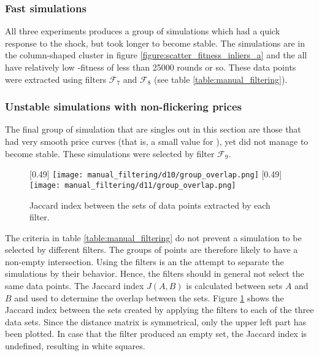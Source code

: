 \subsubsection*{Fast simulations}
All three experiments produces a group of simulations which had a quick response to the shock, but took longer to become stable. The simulations are in the column-shaped cluster in figure \ref{figure:scatter_fitness_inliers_a} and the all have relatively low \timetoreachnewfundamental-fitness of less than 25000 rounds or so. These data points were extracted using filters $\mathcal{F}_7$ and $\mathcal{F}_8$ (see table \ref{table:manual_filtering}).

\subsubsection*{Unstable simulations with non-flickering prices}
The final group of simulation that are singles out in this section are those that had very smooth price curves (that is, a small value for \stdev), yet did not manage to become stable. These simulations were selected by filter $\mathcal{F}_9$.

\begin{figure}
\centering
[0.49\linewidth]
{\texttt{[image: manual\_filtering/d10/group\_overlap.png]}\label{figure:jaccard_index_b}}
[0.49\linewidth]
{\texttt{[image: manual\_filtering/d11/group\_overlap.png]}\label{figure:jaccard_index_c}}
\caption{Jaccard index between the sets of data points extracted by each filter.}
\label{figure:jaccard_index}
\end{figure}

The criteria in table \ref{table:manual_filtering} do not prevent a simulation to be selected by different filters. The groups of points are therefore likely to have a non-empty intersection. Using the filters is an the attempt to separate the simulations by their behavior. Hence, the filters should in general not select the same data points. The Jaccard index $J(A,B)$ is calculated between sets $A$ and $B$ and used to determine the overlap between the sets. Figure \ref{figure:jaccard_index} shows the Jaccard index between the sets created by applying the filters to each of the three data sets. Since the distance matrix is symmetrical, only the upper left part has been plotted. In case that the filter produced an empty set, the Jaccard index is undefined, resulting in white squares.

